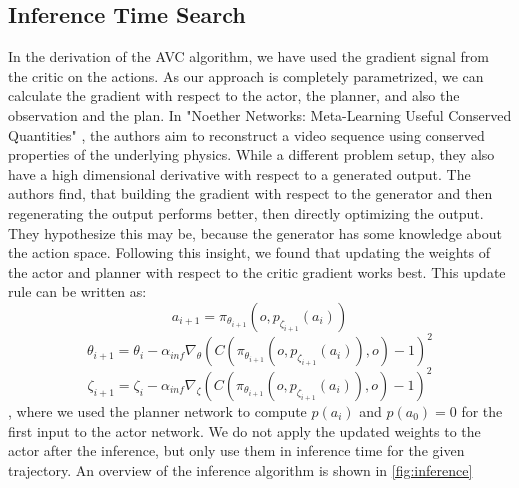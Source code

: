 \subsection{Inference Time Search}
\label{sec:inf_time_search}
In the derivation of the AVC algorithm, we have used the gradient signal from the critic on the actions. As our approach is completely parametrized, we can calculate 
the gradient with respect to the actor, the planner, and also the observation and the plan. In "Noether Networks: Meta-Learning Useful Conserved Quantities" \cite{https://arxiv.org/abs/2112.03321}, 
the authors aim to reconstruct a video sequence 
using conserved properties of the underlying physics. While a different problem setup, they also have a high dimensional derivative with respect to a 
generated output. The authors find, that 
building the gradient with respect to the generator and then regenerating the output performs better, then directly optimizing the output. They hypothesize this 
may be, because the generator has some knowledge about the action space. Following this insight, we found that updating the weights of the actor and planner 
with respect to the critic gradient works best. This update rule can be written as:
\begin{equation}
    a_{i+1} = \pi_{\theta_{i+1}}(o, p_{\zeta_{i+1}}(a_i))
\end{equation}
\begin{equation*}
    \theta_{i+1} = \theta_i - \alpha_{inf} \nabla_{\theta} (C(\pi_{\theta_{i+1}}(o, p_{\zeta_{i+1}}(a_i)), o) - 1)^2
\end{equation*}
\begin{equation*}
    \zeta_{i+1} = \zeta_i - \alpha_{inf} \nabla_{\zeta} (C(\pi_{\theta_{i+1}}(o, p_{\zeta_{i+1}}(a_i)), o) - 1)^2
\end{equation*}
, where we used the planner network to compute $p(a_i)$ and $p(a_0) = 0$ for the first input to the actor network. 
We do not apply the updated weights to the actor after the inference, but only use them in inference time for the given trajectory.  An overview of the inference 
algorithm is shown in \ref{fig:inference}

